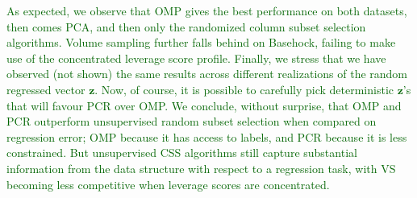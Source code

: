 \documentclass[twoside,11pt]{book}
\newcommand{\rev}[1]{\textcolor{darkgreen}{#1}}
\numberwithin{theorem}{chapter}
\numberwithin{definition}{chapter}
\numberwithin{proposition}{chapter}
\numberwithin{corollary}{chapter}
\numberwithin{example}{chapter}
\numberwithin{lemma}{chapter}
\DeclareMathOperator{\Span}{\mathrm{Span}}
\newcommand{\rb}[1]{\textcolor{magenta}{#1}}
\begin{document}
\rev{As expected, we observe that OMP gives the best performance on both datasets, then comes PCA, and then only the randomized column subset selection algorithms. Volume sampling further falls behind on Basehock, failing to make use of the concentrated leverage score profile.
Finally, we stress that we have observed (not shown) the same results across different realizations of the random regressed vector $\mathbf{z}$. Now, of course, it is possible to carefully pick deterministic $\mathbf{z}$'s that will favour PCR over OMP.
We conclude, without surprise, that OMP and PCR outperform unsupervised random subset selection when compared on regression error; OMP because it has access to labels, and PCR because it is less constrained. But unsupervised CSS algorithms still capture substantial information from the data structure with respect to a regression task, with VS becoming less competitive when leverage scores are concentrated.
}




\end{document}
